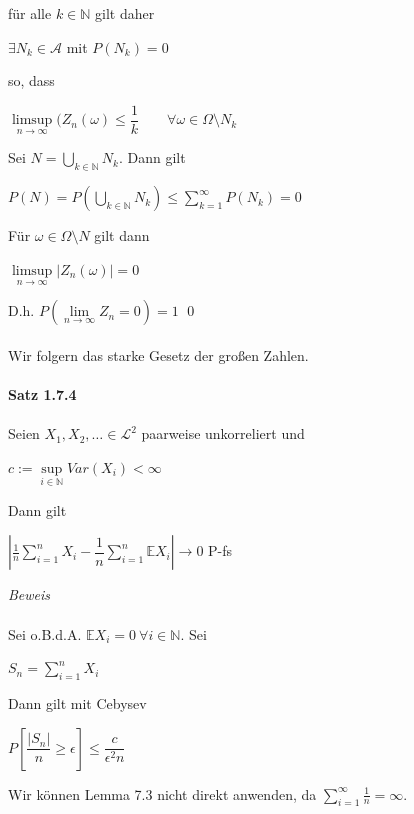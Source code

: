 \documentclass[10pt,a4paper]{report}
\newcommand{\E}{\mathbb{E}}
\numberwithin{equation}{section}
\numberwithin{figure}{section}
\theoremstyle{plain}
\theoremstyle{definition}
\theoremstyle{plain}
\theoremstyle{definition}
\theoremstyle{remark}
\theoremstyle{plain}
\begin{document}
für alle $k \in \mathbb{N}$ gilt daher
\begin{center}
$\exists N_k \in \mathcal{A}$ mit $P(N_k)=0$
\end{center}
so, dass
\begin{center}
$\limsup\limits_{n \to \infty} (Z_n(\omega)\leq \dfrac{1}{k}\qquad \forall\omega \in \Omega\setminus N_k$
\end{center}
Sei $N=\bigcup\limits_{k \in \mathbb{N}}N_k$. Dann gilt
\begin{center}
$P(N)=P\left(\bigcup\limits_{k \in \mathbb{N}}N_k\right)\leq \sum\limits_{k=1}^\infty P(N_k)=0$
\end{center}
Für $\omega \in \Omega\setminus N$ gilt dann
\begin{center}
$\limsup\limits_{n \to \infty} |Z_n(\omega)|=0$
\end{center}
D.h. $P\left(\lim\limits_{n \to \infty}Z_n=0\right)=1$ \qed\\\\
Wir folgern das starke Gesetz der großen Zahlen.\\\\
\textbf{Satz 1.7.4}\\\\
Seien $X_1,X_2,\ldots \in \mathcal{L}^2$ paarweise unkorreliert und
\begin{center}
$c:=\sup\limits_{i \in \mathbb{N}} Var(X_i) < \infty$
\end{center}
Dann gilt
\begin{center}
$\left|\frac{1}{n}\sum\limits_{i=1}^nX_i-\dfrac{1}{n}\sum\limits_{i=1}^n\mathbb{E}X_i\right| \to 0$ P-fs
\end{center}
\textit{Beweis}\\\\
Sei o.B.d.A. $\E X_i=0 ~ \forall i \in \mathbb{N}$. Sei
\begin{center}
$S_n=\sum\limits_{i=1}^nX_i$
\end{center}
Dann gilt mit Cebysev
\begin{center}
$P\left[\dfrac{|S_n|}{n}\geq \epsilon\right]\leq \dfrac{c}{\epsilon^2n}$
\end{center}
Wir können Lemma 7.3 nicht direkt anwenden, da $\sum\limits_{i=1}^\infty \frac{1}{n}=\infty$.
\end{document}
